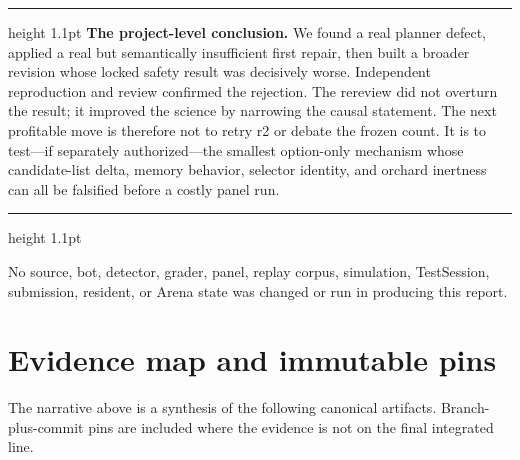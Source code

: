 \documentclass[10pt,a4paper]{article}
\newenvironment{BlueBox}
  {\par\medskip\noindent\begin{minipage}{\textwidth}\color{accent}\hrule height 1.1pt\vspace{5pt}\color{ink}}
  {\vspace{2pt}\color{accent}\hrule height 1.1pt\end{minipage}\par\medskip}
\begin{document}
\begin{BlueBox}
\textbf{The project-level conclusion.} We found a real planner defect, applied a real but
semantically insufficient first repair, then built a broader revision whose locked safety result
was decisively worse. Independent reproduction and review confirmed the rejection. The rereview
did not overturn the result; it improved the science by narrowing the causal statement. The next
profitable move is therefore not to retry r2 or debate the frozen count. It is to test—if separately
authorized—the smallest option-only mechanism whose candidate-list delta, memory behavior,
selector identity, and orchard inertness can all be falsified before a costly panel run.
\end{BlueBox}

No source, bot, detector, grader, panel, replay corpus, simulation, TestSession, submission,
resident, or Arena state was changed or run in producing this report.

\appendix
\section{Evidence map and immutable pins}

The narrative above is a synthesis of the following canonical artifacts. Branch-plus-commit pins
are included where the evidence is not on the final integrated line.
\end{document}
